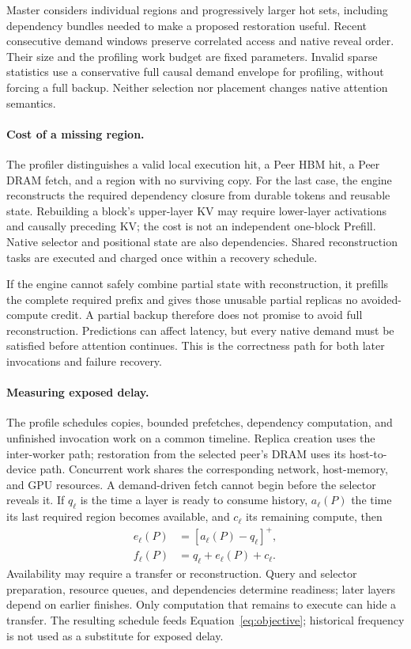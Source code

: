 Master considers individual regions and progressively larger hot sets,
including dependency bundles needed to make a proposed restoration
useful. Recent consecutive demand windows preserve correlated access
and native reveal order. Their size and the profiling work budget are
fixed parameters. Invalid sparse statistics use a conservative full
causal demand envelope for profiling, without forcing a full backup.
Neither selection nor placement changes native attention semantics.

\paragraph{Cost of a missing region.}
The profiler distinguishes a valid local execution hit, a Peer HBM hit, a
Peer DRAM fetch, and a region with no surviving copy. For the last case,
the engine reconstructs the required dependency closure from durable
tokens and reusable state. Rebuilding a block's upper-layer KV may
require lower-layer activations and causally preceding KV; the cost is
not an independent one-block Prefill. Native selector and positional
state are also dependencies. Shared reconstruction tasks are executed
and charged once within a recovery schedule.

If the engine cannot safely combine partial state with reconstruction,
it prefills the complete required prefix and gives those unusable
partial replicas no avoided-compute credit. A partial backup therefore
does not promise to avoid full reconstruction. Predictions can affect
latency, but every native demand must be satisfied before attention
continues. This is the correctness path for both later invocations
and failure recovery.

\paragraph{Measuring exposed delay.}
The profile schedules copies, bounded prefetches, dependency computation,
and unfinished invocation work on a common timeline. Replica creation
uses the inter-worker path; restoration from the selected peer's DRAM
uses its host-to-device path. Concurrent work shares the corresponding
network, host-memory, and GPU resources. A demand-driven
fetch cannot begin before the selector reveals it. If $q_\ell$ is the
time a layer is ready to consume history, $a_\ell(P)$ the time its last
required region becomes available, and $c_\ell$ its remaining compute,
then
\begin{equation}
 \begin{aligned}
 e_\ell(P)&=[a_\ell(P)-q_\ell]^+,\\
 f_\ell(P)&=q_\ell+e_\ell(P)+c_\ell.
 \end{aligned}
 \label{eq:overlap}
\end{equation}
Availability may require a transfer or reconstruction. Query and
selector preparation, resource queues, and dependencies determine
readiness; later layers depend on earlier finishes. Only computation
that remains to execute can hide a transfer. The resulting schedule
feeds Equation~\ref{eq:objective}; historical frequency is not
used as a substitute for exposed delay.

